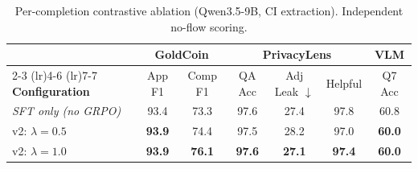 \begin{table}[ht]
\centering
\caption{Per-completion contrastive ablation (Qwen3.5-9B, CI extraction). Independent no-flow scoring.}
\label{tab:contrastive-v2}
\begin{tabular}{lcccccc}
\toprule
 & \multicolumn{2}{c}{\textbf{GoldCoin}} & \multicolumn{3}{c}{\textbf{PrivacyLens}} & \multicolumn{1}{c}{\textbf{VLM}} \\
\cmidrule(lr){2-3} \cmidrule(lr){4-6} \cmidrule(lr){7-7}
\textbf{Configuration} & App F1 & Comp F1 & QA Acc & Adj Leak $\downarrow$ & Helpful & Q7 Acc \\
\midrule
\textit{SFT only (no GRPO)} & 93.4 & 73.3 & 97.6 & 27.4 & 97.8 & 60.8 \\
\midrule
v2: $\lambda=0.5$ & \textbf{93.9} & 74.4 & 97.5 & 28.2 & 97.0 & \textbf{60.0} \\
v2: $\lambda=1.0$ & \textbf{93.9} & \textbf{76.1} & \textbf{97.6} & \textbf{27.1} & \textbf{97.4} & \textbf{60.0} \\
\bottomrule
\end{tabular}
\end{table}